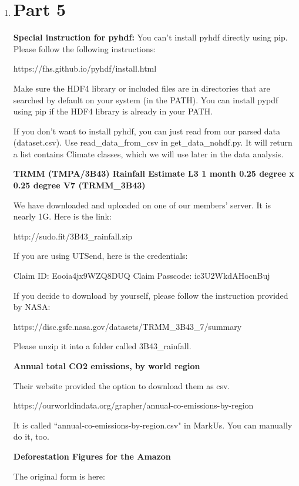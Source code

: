 \documentclass[12pt]{article}
\begin{document}
\begin{enumerate}
\newpage

\item \section*{Part 5}

\begin{text}

\textbf{Special instruction for pyhdf:}
You can't install pyhdf directly using pip. Please follow the following instructions:

https://fhs.github.io/pyhdf/install.html

Make sure the HDF4 library or included files are in directories that are searched by default on your system (in the PATH). You can install pypdf using pip if the HDF4 library is already in your PATH.

If you don't want to install pyhdf, you can just read from our parsed data (dataset.csv). Use read\_data\_from\_csv in get\_data\_nohdf.py. It will return a list contains Climate classes, which we will use later in the data analysis.

\textbf{TRMM (TMPA/3B43) Rainfall Estimate L3 1 month 0.25 degree x 0.25 degree V7 (TRMM\_3B43)}

We have downloaded and uploaded on one of our members' server. It is nearly 1G. Here is the link:

http://sudo.fit/3B43\_rainfall.zip

If you are using UTSend, here is the credentials:

Claim ID: Eooia4jx9WZQ8DUQ
Claim Passcode: ic3U2WkdAHocnBuj

If you decide to download by yourself, please follow the instruction provided by NASA:

https://disc.gsfc.nasa.gov/datasets/TRMM\_3B43\_7/summary

Please unzip it into a folder called 3B43\_rainfall.

\textbf{Annual total CO2 emissions, by world region}

Their website provided the option to download them as csv.

https://ourworldindata.org/grapher/annual-co-emissions-by-region

It is called ``annual-co-emissions-by-region.csv" in MarkUs.
You can manually do it, too.

\textbf{Deforestation Figures for the Amazon}

The original form is here:


\end{text}
\end{enumerate}
\end{document}
